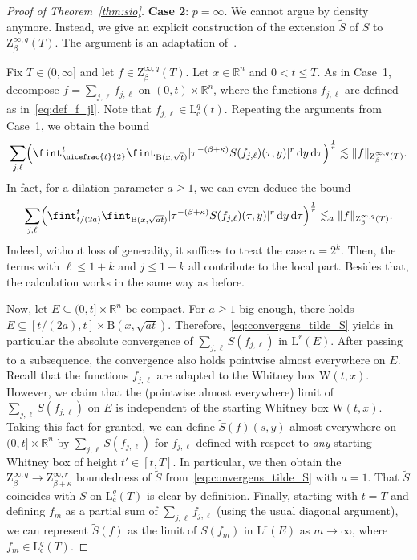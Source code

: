 \documentclass[11pt, leqno]{amsart}
\theoremstyle{definition}
\newcommand{\R}{\mathbb{R}}
\renewcommand{\L}{\mathrm{L}}
\newcommand{\Z}{\mathrm{Z}}
\newcommand{\WB}{\mathrm{W}}
\renewcommand{\d}{\,\mathrm{d}}
\newcommand{\cc}{\mathrm{c}}
\newcommand{\B}{\mathrm{B}}
\begin{document}
\begin{proof}[Proof of Theorem~\ref{thm:sio}]
		\textbf{Case 2}: $p = \infty$. We cannot argue by density anymore. Instead, we give an explicit construction of the extension $\tilde S$ of $S$ to $\Z^{\infty,q}_\beta(T)$. The argument is an adaptation of~\cite[Thm.~3.1]{Auscher_Portal}.

		Fix $T \in (0,\infty]$ and let $f \in \Z^{\infty,q}_\beta(T)$. Let $x \in \R^n$ and $0 < t \leq T.$ As in Case~1, decompose $f = \sum_{j,\ell} f_{j,\ell}$ on $(0,t) \times \R^n$, where the functions $f_{j,\ell}$ are defined as in~\eqref{eq:def_f_jl}. Note that $f_{j,\ell} \in \L^q_\cc(t)$. Repeating the arguments from Case~1, we obtain the bound
		\begin{align}
			\sum_{j, \ell} \Bigl( \fint_{\nicefrac{t}{2}}^t \fint_{\B(x,\sqrt{t})} |\tau^{-(\beta + \kappa)} S(f_{j,\ell})(\tau,y)|^r \d y \d \tau \Bigr)^\frac{1}{r} \lesssim \| f \|_{\Z^{\infty,q}_\beta(T)}.
		\end{align}
		In fact, for a dilation parameter $a \geq 1$, we can even deduce the bound
		\begin{align}
			\label{eq:convergens_tilde_S}
			\sum_{j, \ell} \Bigl( \fint_{t/(2a)}^t \fint_{\B(x,\sqrt{a t})} |\tau^{-(\beta + \kappa)} S(f_{j,\ell})(\tau,y)|^r \d y \d \tau \Bigr)^\frac{1}{r} \lesssim_a \| f \|_{\Z^{\infty,q}_\beta(T)}.
		\end{align}
		Indeed, without loss of generality, it suffices to treat the case $a = 2^k$. Then, the terms with $\ell \leq 1 + k$ and $j \leq 1 + k$ all contribute to the local part. Besides that, the calculation works in the same way as before.

		Now, let $E \subseteq (0,t] \times \R^n$ be compact. For $a \geq 1$ big enough, there holds $E\subseteq [t/(2a),t] \times \overline{\B}(x,\sqrt{at})$. Therefore,~\eqref{eq:convergens_tilde_S} yields in particular the absolute convergence of $\sum_{j,\ell} S(f_{j,\ell})$ in $\L^r(E)$. After passing to a subsequence, the convergence also holds pointwise almost everywhere on $E$. Recall that the functions $f_{j,\ell}$ are adapted to the Whitney box $\WB(t,x)$. However, we claim that the (pointwise almost everywhere) limit of $\sum_{j,\ell} S(f_{j,\ell})$ on $E$ is independent of the starting Whitney box $\WB(t,x)$. Taking this fact for granted, we can define $\widetilde{S}(f)(s,y)$ almost everywhere on $(0,t] \times \R^n$ by $\sum_{j,\ell} S(f_{j,\ell})$ for $f_{j,\ell}$ defined with respect to \emph{any} starting Whitney box of height $t' \in [t,T]$. In particular, we then obtain the $\Z^{\infty,q}_\beta \to \Z^{\infty,r}_{\beta + \kappa}$ boundedness of $\widetilde{S}$ from~\eqref{eq:convergens_tilde_S} with $a = 1$. That $\tilde S$ coincides with $S$ on $\L^q_\cc(T)$ is clear by definition. Finally, starting with $t = T$ and defining $f_m$ as a partial sum of $\sum_{j,\ell} f_{j,\ell}$ (using the usual diagonal argument), we can represent $\tilde S(f)$ as the limit of $S(f_m)$ in $\L^r(E)$ as $m\to \infty$, where $f_m \in \L^q_\cc(T)$.


\end{proof}
\end{document}
